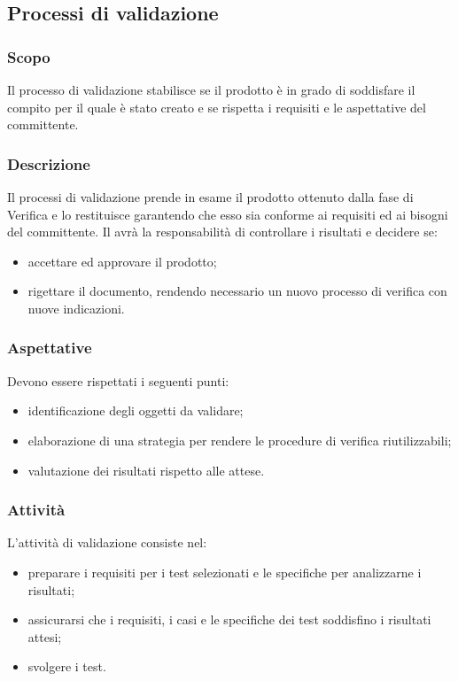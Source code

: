 \subsection{Processi di validazione}
\subsubsection{Scopo}
Il processo di validazione stabilisce se il prodotto è in grado di soddisfare il compito per il quale è stato creato e se  rispetta i requisiti e le aspettative del committente.
\subsubsection{Descrizione}
Il processi di validazione prende in esame il prodotto ottenuto dalla fase di Verifica e lo restituisce garantendo che esso sia conforme ai requisiti ed ai bisogni del committente.
Il \RdP{} avrà la responsabilità di controllare i risultati e decidere se:
\begin{itemize}
	\item accettare ed approvare il prodotto;
	\item rigettare il documento, rendendo necessario un nuovo processo di verifica con nuove indicazioni.
\end{itemize}
\subsubsection{Aspettative}
Devono essere rispettati i seguenti punti:
\begin{itemize}
	\item identificazione degli oggetti da validare;
	\item elaborazione di una strategia per rendere le procedure di verifica riutilizzabili;
	\item valutazione dei risultati rispetto alle attese.
\end{itemize}

\subsubsection{Attività}
L'attività di validazione consiste nel:
\begin{itemize}
	\item preparare i requisiti per i test selezionati e le specifiche per analizzarne i risultati;
	\item assicurarsi che i requisiti, i casi e le specifiche dei test soddisfino i risultati attesi;
	\item svolgere i test.
\end{itemize}

